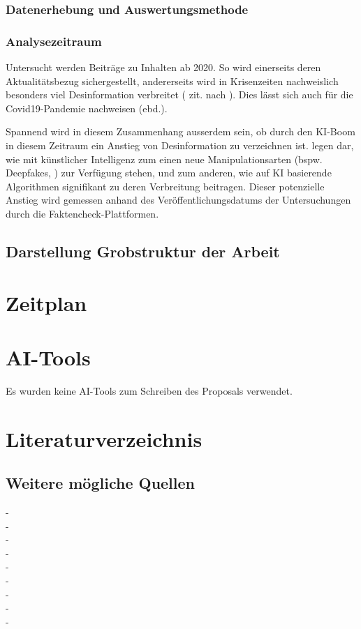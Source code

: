 \documentclass[12pt,a4paper]{article}        %
\begin{document}
\subsubsection{Datenerhebung und Auswertungsmethode}
\subsubsection{Analysezeitraum}
Untersucht werden Beiträge zu Inhalten ab 2020. So wird einerseits deren Aktualitätsbezug sichergestellt, andererseits wird in Krisenzeiten nachweislich besonders viel Desinformation verbreitet (\textcite{tandoc_defining_2018} zit. nach \textcite[2]{ceron_fake_2021}). Dies lässt sich auch für die Covid19-Pandemie nachweisen (ebd.).

Spannend wird in diesem Zusammenhang ausserdem sein, ob durch den KI-Boom in diesem Zeitraum ein Anstieg von Desinformation zu verzeichnen ist. \textcite[e32-3]{bontridder_role_2021} legen dar, wie mit künstlicher Intelligenz zum einen neue Manipulationsarten (bspw. Deepfakes, ) zur Verfügung stehen, und zum anderen, wie auf KI basierende Algorithmen signifikant zu deren Verbreitung beitragen.
Dieser potenzielle Anstieg wird gemessen anhand des Veröffentlichungsdatums der Untersuchungen durch die Faktencheck-Plattformen.


\subsection{Darstellung Grobstruktur der Arbeit}

\section{Zeitplan}

\section{AI-Tools}
Es wurden keine AI-Tools zum Schreiben des Proposals verwendet.

\pagebreak
\section{Literaturverzeichnis}
\printbibliography
\subsection{Weitere mögliche Quellen}

- \cite{antos_web_2019} \\
- \cite{brill_death_2024} \\
- \cite{fernandes_post-factual_2022} \\
- \cite{latzer_vertrauen_2023} \\
- \cite{reuter_fake_2019} \\
- \cite{wahl_fake_2021} \\
- \cite{dander_fake_2020} \\
- \cite{waller_jamesfocus_2019} \\
- \cite{zoglauer_konstruierte_2021} \\
\end{document}
